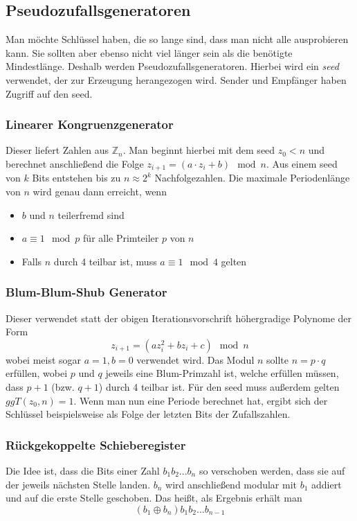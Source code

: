 \documentclass[a4paper, 12pt]{article}
\theoremstyle{plain}
\theoremstyle{definition}
\theoremstyle{lemma}
\theoremstyle{remark}
\theoremstyle{corollary}
\theoremstyle{example}
\begin{document}
	\subsection{Pseudozufallsgeneratoren}
	Man möchte Schlüssel haben, die so lange sind, dass man nicht alle ausprobieren kann. Sie sollten aber ebenso nicht viel länger sein als die benötigte Mindestlänge. Deshalb werden Pseudozufallsgeneratoren. Hierbei wird ein \textit{seed} verwendet, der zur Erzeugung herangezogen wird. Sender und Empfänger haben Zugriff auf den seed.
	\subsubsection{Linearer Kongruenzgenerator}
	Dieser liefert Zahlen aus $\mathbb{Z}_n$. Man beginnt hierbei mit dem seed $z_0 < n$ und berechnet anschließend die Folge $z_{i+1} = (a\cdot z_i + b) \mod n$. Aus einem seed von $k$ Bits entstehen bis zu $n \approx 2^k$ Nachfolgezahlen. Die maximale Periodenlänge von $n$ wird genau dann erreicht, wenn \begin{itemize}
		\item $b$ und $n$ teilerfremd sind
		\item $a\equiv 1 \mod p$ für alle Primteiler $p$ von $n$
		\item Falls $n$ durch 4 teilbar ist, muss $a \equiv 1 \mod 4$ gelten
	\end{itemize} 
	\subsubsection{Blum-Blum-Shub Generator}
	Dieser verwendet statt der obigen Iterationsvorschrift höhergradige Polynome der Form \[z_{i+1} = (az_i^2 + bz_i + c) \mod n\] wobei meist sogar $a=1,b=0$ verwendet wird. Das Modul $n$ sollte $n=p\cdot q$ erfüllen, wobei $p$ und $q$ jeweils eine Blum-Primzahl ist, welche erfüllen müssen, dass $p+1$ (bzw. $q+1$) durch 4 teilbar ist. Für den seed muss außerdem gelten $ggT(z_0,n) = 1$. Wenn man nun eine Periode berechnet hat, ergibt sich der Schlüssel beispielsweise als Folge der letzten Bits der Zufallszahlen.
	\subsubsection{Rückgekoppelte Schieberegister}
	Die Idee ist, dass die Bits einer Zahl $b_1b_2...b_n$ so verschoben werden, dass sie auf der jeweils nächsten Stelle landen. $b_n$ wird anschließend modular mit $b_1$ addiert und auf die erste Stelle geschoben. Das heißt, als Ergebnis erhält man \[(b_1\oplus b_n)b_1b_2...b_{n-1}\]
\end{document}
